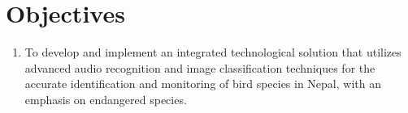 
\section{Objectives}
\begin{enumerate}[label=\roman*]
    \item To develop and implement an integrated technological solution that utilizes
          advanced audio recognition and image classification techniques for the accurate
          identification and monitoring of bird species in Nepal, with an emphasis on
          endangered species.
\end{enumerate}

